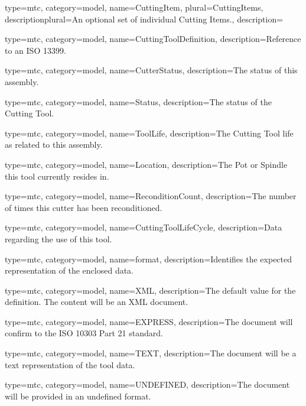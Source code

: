 {
  type=mtc,
  category=model,
  name={CuttingItem},
  plural={CuttingItems},
  descriptionplural={An optional set of individual Cutting Items.},
  description={}
}


{
  type=mtc,
  category=model,
  name={CuttingToolDefinition},
  description={Reference to an ISO 13399.}
}


{
  type=mtc,
  category=model,
  name={CutterStatus},
  description={The status of this assembly.}
}


{
  type=mtc,
  category=model,
  name={Status},
  description={The status of the Cutting Tool.}
}


{
  type=mtc,
  category=model,
  name={ToolLife},
  description={The Cutting Tool life as related to this assembly.}
}


{
  type=mtc,
  category=model,
  name={Location},
  description={The Pot or Spindle this tool currently resides in.}
}


{
  type=mtc,
  category=model,
  name={ReconditionCount},
  description={The number of times this cutter has been reconditioned.}
}


{
  type=mtc,
  category=model,
  name={CuttingToolLifeCycle},
  description={Data regarding the use of this tool.}
}


{
  type=mtc,
  category=model,
  name={format},
  description={Identifies the expected representation of the enclosed data.}
}


{
  type=mtc,
  category=model,
  name={XML},
  description={The default value for the definition. The content will be an XML document.}
}


{
  type=mtc,
  category=model,
  name={EXPRESS},
  description={The document will confirm to the ISO 10303 Part 21 standard.}
}


{
  type=mtc,
  category=model,
  name={TEXT},
  description={The document will be a text representation of the tool data.}
}


{
  type=mtc,
  category=model,
  name={UNDEFINED},
  description={The document will be provided in an undefined format.}
}


